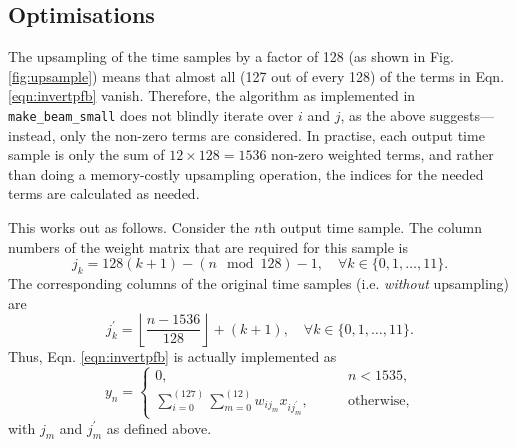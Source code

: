 \documentclass{article}
\begin{document}
\subsection{Optimisations}

The upsampling of the time samples by a factor of 128 (as shown in Fig. \ref{fig:upsample}) means that almost all (127 out of every 128) of the terms in Eqn. \eqref{eqn:invertpfb} vanish.
Therefore, the algorithm as implemented in \texttt{make\_beam\_small} does not blindly iterate over $i$ and $j$, as the above suggests---instead, only the non-zero terms are considered.
In practise, each output time sample is only the sum of $12 \times 128 = 1536$ non-zero weighted terms, and rather than doing a memory-costly upsampling operation, the indices for the needed terms are calculated as needed.

This works out as follows.
Consider the $n$th output time sample.
The column numbers of the weight matrix that are required for this sample is
\begin{equation}
    j_k = 128(k+1) - (n \mod 128) - 1, \quad \forall k \in \{0,1,\dots,11\}.
\end{equation}
The corresponding columns of the original time samples (i.e. \emph{without} upsampling) are
\begin{equation}
    j_k^\prime = \left\lfloor \frac{n - 1536}{128} \right\rfloor + (k+1), \quad \forall k \in \{0,1,\dots,11\}.
\end{equation}
Thus, Eqn. \eqref{eqn:invertpfb} is actually implemented as
\begin{equation}
    y_n = \begin{cases}
        0, &\qquad n < 1535, \\[5pt]
              \sum\limits_{i=0}^{(127)} \sum\limits_{m=0}^{(12)} w_{ij_m} x_{ij_m^\prime}, &\qquad \text{otherwise,}
          \end{cases}
    \label{eqn:invertpfb_optimised}
\end{equation}
with $j_m$ and $j^\prime_m$ as defined above.
\end{document}
